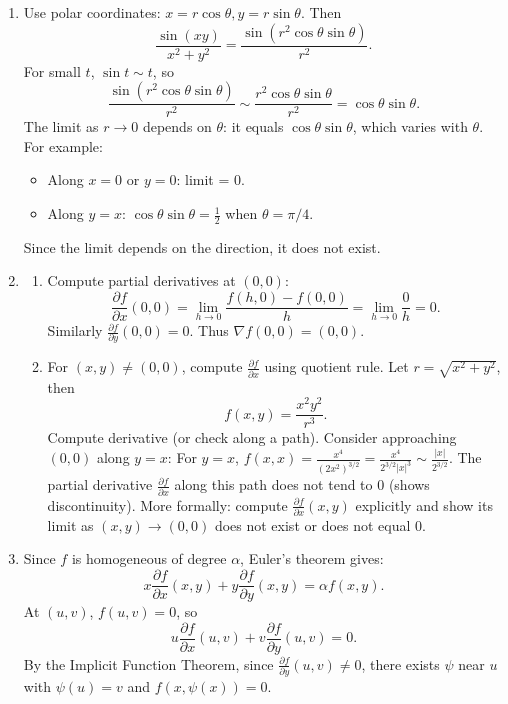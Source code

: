 \documentclass[12pt]{article}
\begin{document}
\begin{answerbox}
\begin{enumerate}
    \item Use polar coordinates: \( x = r\cos\theta, y = r\sin\theta \). Then
    \[
    \frac{\sin(xy)}{x^2+y^2} = \frac{\sin(r^2\cos\theta\sin\theta)}{r^2}.
    \]
    For small \( t \), \( \sin t \sim t \), so
    \[
    \frac{\sin(r^2\cos\theta\sin\theta)}{r^2} \sim \frac{r^2\cos\theta\sin\theta}{r^2} = \cos\theta\sin\theta.
    \]
    The limit as \( r \to 0 \) depends on \( \theta \): it equals \( \cos\theta\sin\theta \), which varies with \( \theta \). For example:
    \begin{itemize}
        \item Along \( x=0 \) or \( y=0 \): limit = 0.
        \item Along \( y=x \): \( \cos\theta\sin\theta = \frac{1}{2} \) when \( \theta=\pi/4 \).
    \end{itemize}
    Since the limit depends on the direction, it does not exist.
    
    \item 
    \begin{enumerate}
        \item Compute partial derivatives at \( (0,0) \):
        \[
        \frac{\partial f}{\partial x}(0,0) = \lim_{h\to 0} \frac{f(h,0)-f(0,0)}{h} = \lim_{h\to 0} \frac{0}{h} = 0.
        \]
        Similarly \( \frac{\partial f}{\partial y}(0,0)=0 \). Thus \( \nabla f(0,0) = (0,0) \).
        
        \item For \( (x,y) \neq (0,0) \), compute \( \frac{\partial f}{\partial x} \) using quotient rule. Let \( r=\sqrt{x^2+y^2} \), then
        \[
        f(x,y) = \frac{x^2 y^2}{r^3}.
        \]
        Compute derivative (or check along a path). Consider approaching \( (0,0) \) along \( y=x \):
        For \( y=x \), \( f(x,x) = \frac{x^4}{(2x^2)^{3/2}} = \frac{x^4}{2^{3/2}|x|^3} \sim \frac{|x|}{2^{3/2}} \).
        The partial derivative \( \frac{\partial f}{\partial x} \) along this path does not tend to 0 (shows discontinuity).
        More formally: compute \( \frac{\partial f}{\partial x}(x,y) \) explicitly and show its limit as \( (x,y)\to(0,0) \) does not exist or does not equal 0.
    \end{enumerate}
    
    \item Since \( f \) is homogeneous of degree \( \alpha \), Euler's theorem gives:
    \[
    x \frac{\partial f}{\partial x}(x,y) + y \frac{\partial f}{\partial y}(x,y) = \alpha f(x,y).
    \]
    At \( (u,v) \), \( f(u,v)=0 \), so
    \[
    u \frac{\partial f}{\partial x}(u,v) + v \frac{\partial f}{\partial y}(u,v) = 0.
    \]
    By the Implicit Function Theorem, since \( \frac{\partial f}{\partial y}(u,v) \neq 0 \), there exists \( \psi \) near \( u \) with \( \psi(u)=v \) and \( f(x,\psi(x))=0 \).
    

\end{enumerate}
\end{answerbox}
\end{document}
